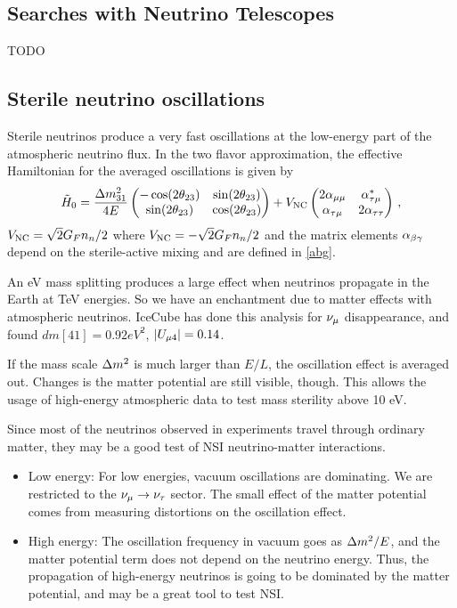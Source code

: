 \documentclass[twocolumn]{article}
\begin{document}
\subsection*{Searches with Neutrino Telescopes}
TODO
\subsection*{Sterile neutrino oscillations}
Sterile neutrinos produce a very fast oscillations at the low-energy part of the atmospheric neutrino flux. In the two flavor approximation, the effective Hamiltonian for the averaged oscillations is given by
\begin{align*}
  \tilde{H}_0 = \frac{\dm[31]}{4E} 
  \begin{pmatrix} -\cos(2\th_{23}) & \sin(2\th_{23}) \\ \sin(2\th_{23}) & \cos(2\th_{23}) \end{pmatrix}
  + V_\t{NC} \begin{pmatrix} 2 \a_{\mu\mu} & \a^*_{\tau\mu} \\ \a_{\tau\mu} & 2\a_{\tau\tau} \end{pmatrix} 
\,,\end{align*}
$V_{\text{{NC}}} = \sqrt{2}G_F n_n/2 $ where $V_{\text{{NC}}} = -\sqrt{2}G_F n_n/2 $ and the matrix elements $\alpha_{\beta \gamma}$ depend on the sterile-active mixing and are defined in \eqref{abg}.

An eV mass splitting produces a large effect when neutrinos propagate in the Earth at TeV energies. So we have an enchantment due to matter effects with atmospheric neutrinos. IceCube has done this analysis for $\nu_\mu$ disappearance, and found $dm[41] = 0.92 eV^2$, $\abs{U_{\mu 4}} = 0.14$. 

If the mass scale $\dm$ is much larger than $E/L$, the oscillation effect is averaged out. Changes is the matter potential are still visible, though. This allows the usage of high-energy atmospheric data to test mass sterility above 10 eV.

Since most of the neutrinos observed in experiments travel through ordinary matter, they may be a good test of NSI neutrino-matter interactions.
\begin{itemize}
  \item Low energy: For low energies, vacuum oscillations are dominating. We are restricted to the $\nu_\mu \to \nu_\tau$ sector. The small effect of the matter potential comes from measuring distortions on the oscillation effect.
  \item High energy: The oscillation frequency in vacuum goes as $\dm/E$, and the matter potential term does not depend on the neutrino energy. Thus, the propagation of high-energy neutrinos is going to be dominated by the matter potential, and may be a great tool to test NSI.
\end{itemize}
\end{document}
